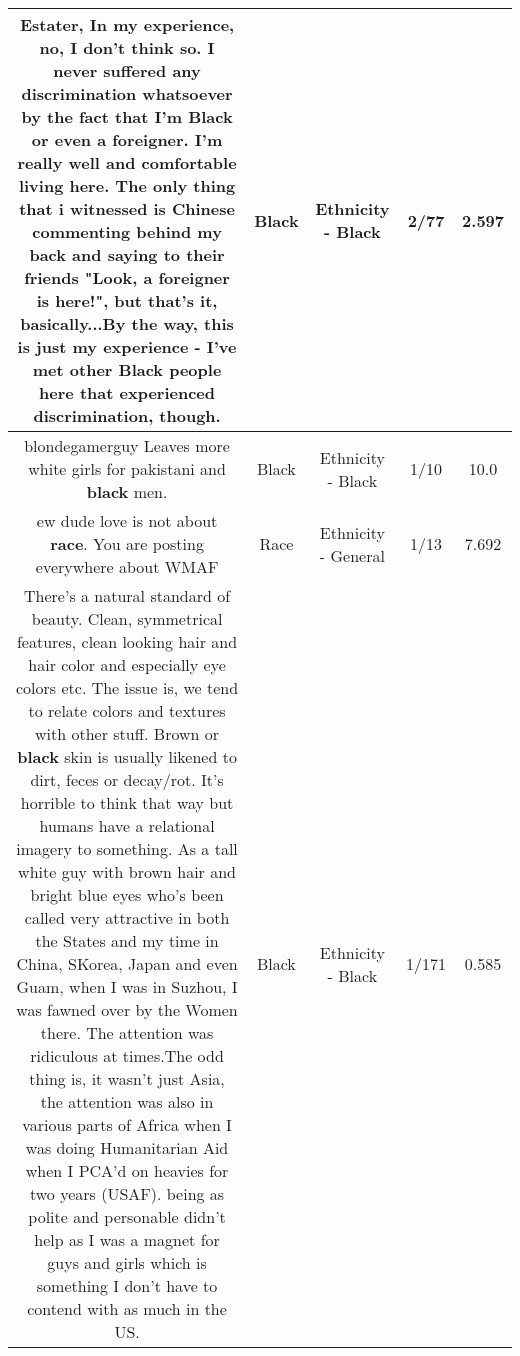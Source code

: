 \documentclass[11pt]{article}
\newlength\mylength
\begin{document}
\begin{center}
\begin{longtable}{|C{.65\mylength}|C{.30\mylength}|C{.12\mylength}|C{.12\mylength}|C{.12\mylength}|}
  \small Estater, In my experience, no, I don't think so. I never suffered any discrimination whatsoever by the fact that I'm \textbf{Black} or even a foreigner. I'm really well and comfortable living here. The only thing that i witnessed is Chinese commenting behind my back and saying to their friends "Look, a foreigner is here!", but that's it, basically...By the way, this is just my experience - I've met other \textbf{Black} people here that experienced discrimination, though.\normalsize   & Black & Ethnicity - Black & 2/77 & 2.597 \\  \hline
  \small blondegamerguy Leaves more white girls for pakistani and \textbf{black} men.\normalsize   & Black & Ethnicity - Black & 1/10 & 10.0 \\  \hline
  \small ew dude love is not about \textbf{race}. You are posting everywhere about WMAF\normalsize   & Race & Ethnicity - General & 1/13 & 7.692 \\  \hline
  \small There's a natural standard of beauty. Clean, symmetrical features, clean looking hair and hair color and especially eye colors etc. The issue is, we tend to relate colors and textures with other stuff. Brown or \textbf{black} skin is usually likened to dirt, feces or decay/rot. It's horrible to think that way but humans have a relational imagery to something. As a tall white guy with brown hair and bright blue eyes who's been called very attractive in both the States and my time in China, SKorea, Japan and even Guam, when I was in Suzhou, I was fawned over by the Women there. The attention was ridiculous at times.The odd thing is, it wasn't just Asia, the attention was also in various parts of Africa when I was doing Humanitarian Aid when I PCA'd on heavies for two years (USAF). being as polite and personable didn't help as I was a magnet for guys and girls which is something I don't have to contend with as much in the US.\normalsize   & Black & Ethnicity - Black & 1/171 & 0.585 \\  \hline

\end{longtable}
\end{center}
\end{document}
